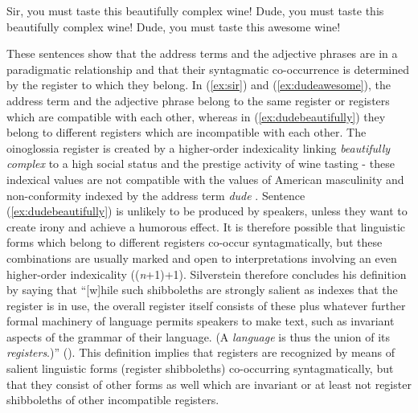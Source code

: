\ea\label{ex:sir} Sir, you must taste this beautifully complex wine!
\ex\label{ex:dudebeautifully} Dude, you must taste this beautifully complex wine!
\ex\label{ex:dudeawesome} Dude, you must taste this awesome wine!
\z 

These sentences show that the address terms and the adjective phrases are in a paradigmatic relationship and that their syntagmatic co-occurrence is determined by the register to which they belong. In (\ref{ex:sir}) and (\ref{ex:dudeawesome}), the address term and the adjective phrase belong to the same register or registers which are compatible with each other, whereas in (\ref{ex:dudebeautifully}) they belong to different registers which are incompatible with each other. The oinoglossia register is created by a higher-order indexicality linking \emph{beautifully complex} to a high social status and the prestige activity of wine tasting - these indexical values are not compatible with the values of American masculinity and non-conformity indexed by the address term \emph{dude} \citep{Kiesling2004}. Sentence (\ref{ex:dudebeautifully}) is unlikely to be produced by speakers, unless they want to create irony and achieve a humorous effect. It is therefore possible that linguistic forms which belong to different registers co-occur syntagmatically, but these combinations are usually marked and open to interpretations involving an even higher-order indexicality ((\emph{n}+1)+1). Silverstein therefore concludes his definition by saying that “[w]hile such shibboleths are strongly salient as indexes that the register is in use, the overall register itself consists of these plus whatever further formal machinery of language permits speakers to make text, such as invariant aspects of the grammar of their language. (A \textit{language} is thus the union of its \textit{registers}.)” (\citeyear[212]{Silverstein2003}). This definition implies that registers are recognized by means of salient linguistic forms (register shibboleths) co-occurring syntagmatically, but that they consist of other forms as well which are invariant or at least not register shibboleths of other incompatible registers.


